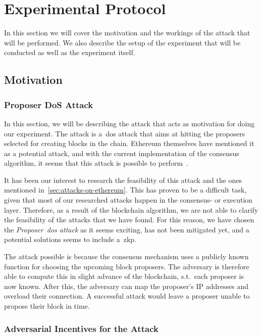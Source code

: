 

\section{Experimental Protocol}\label{sec:experimental-protocol}
In this section we will cover the motivation and the workings of the attack that will be performed.
We also describe the setup of the experiment that will be conducted as well as the experiment itself.

\subsection{Motivation}\label{subsec:proposer-dos-attack}
\subsubsection{Proposer DoS Attack}
In this section, we will be describing the attack that acts as motivation for doing our experiment.
The attack is a~\gls{dos} attack that aims at hitting the proposers selected for creating blocks in the chain.
Ethereum themselves have mentioned it as a potential attack, and with the current implementation of the consensus algorithm, it seems that this attack is possible to perform~\cite{EthereumSSLE2024,EthereumAttackDefense2024}.

It has been our interest to research the feasibility of this attack and the ones mentioned in~\autoref{sec:attacks-on-ethereum}.
This has proven to be a difficult task, given that most of our researched attacks happen in the consensus- or execution layer.
Therefore, as a result of the blockchain algorithm, we are not able to clarify the feasibility of the attacks that we have found.
For this reason, we have chosen the \textit{Proposer~\gls{dos} attack} as it seems exciting, has not been mitigated yet, and a potential solutions seems to include a~\gls{zkp}.

The attack possible is because the consensus mechanism uses a publicly known function for choosing the upcoming block proposers.
The adversary is therefore able to compute this in slight advance of the blockchain, s.t.\ each proposer is now known.
After this, the adversary can map the proposer's IP addresses and overload their connection.
A successful attack would leave a proposer unable to propose their block in time.

\subsubsection{Adversarial Incentives for the Attack}

